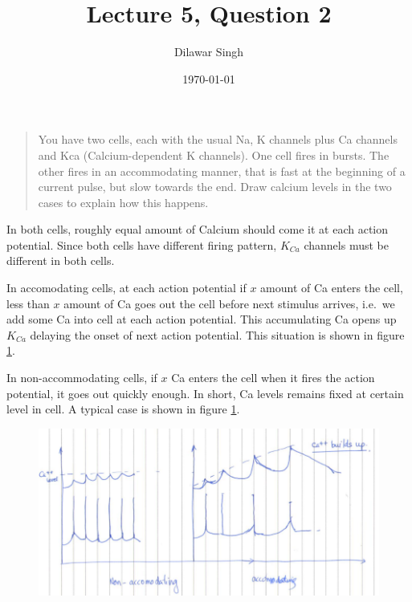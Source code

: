 \documentclass[]{article}
\title{Lecture 5, Question 2}
\author{Dilawar Singh}
\date{\today}
\begin{document}
\maketitle

\begin{quote}
You have two cells, each with the usual Na, K channels plus Ca channels
and Kca (Calcium-dependent K channels). One cell fires in bursts. The
other fires in an accommodating manner, that is fast at the beginning of
a current pulse, but slow towards the end. Draw calcium levels in the
two cases to explain how this happens.
\end{quote}

In both cells, roughly equal amount of Calcium should come it at each
action potential. Since both cells have different firing pattern,
$K_{Ca}$ channels must be different in both cells.

In accomodating cells, at each action potential if $x$ amount of Ca
enters the cell, less than $x$ amount of Ca goes out the cell before
next stimulus arrives, i.e.~we add some Ca into cell at each action
potential. This accumulating Ca opens up $K_{Ca}$ delaying the onset of
next action potential. This situation is shown in figure \ref{fig:1}.

In non-accommodating cells, if $x$ Ca enters the cell when it fires the
action potential, it goes out quickly enough. In short, Ca levels
remains fixed at certain level in cell. A typical case is shown in
figure \ref{fig:1}.

\begin{figure}[ht!]
\begin{center}
    \includegraphics[width=1\textwidth]{scan.png}
\end{center}
\caption{}
\label{fig:1}
\end{figure}
\end{document}
